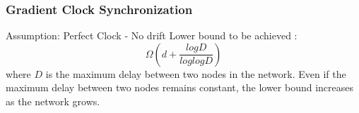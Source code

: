 \documentclass[t]{beamer}
\begin{document}
\begin{frame}
 \frametitle{Gradient Clock Synchronization}
  Assumption: Perfect Clock - No drift \newline \newline
Lower bound to be achieved :  \begin{equation}
   \Omega(d + \frac{logD}{loglogD})
  \end{equation}
\newline
  where \newline \newline
  $D$ is the maximum delay between two nodes in the network. \newline
  \newline
  Even if the maximum delay between two nodes remains constant, the lower bound increases as the network grows.
\end{frame}
\end{document}
